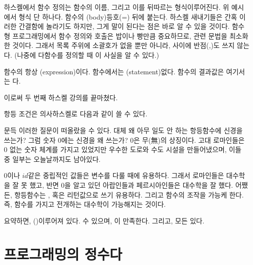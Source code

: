 하스켈에서 함수 정의는 함수의 이름, 그리고 이를 뒤따르는 형식\trParameter\로 이루어진다.
위 예시에서 형식\trParameter\는  단 하나다.
함수의 \trFunctionBody(body)\는 등호(=) 뒤에 붙는다.
하스켈 새내기들은 간혹 이러한 간결함에 놀라기도 하지만, 그게 말이 된다는 점은 바로 알 수 있을 것이다.
함수형 프로그래밍에서 함수 정의와 호출은 밥이나 빵만큼 중요하므로, 관련 문법을 최소화한 것이다.
그래서 \trArgument 목록 주위에 소괄호가 없을 뿐만 아니라, \trArgument 사이에 반점(,)도 쓰지 않는다.
(나중에 다\trArgument 함수를 정의할 때 이 사실을 알 수 있다.)

함수의 \trFunctionBody\는 항상 \trExpression(expression)이다. 함수에서는 \trStatement(statement)\는 없다. 
함수의 결과값은  여기서는 다.

이로써 두 번째 하스켈 강의를 끝마쳤다.

항등 조건은 의사하스켈로 다음과 같이 쓸 수 있다.

문득 이러한 질문이 떠올랐을 수 있다. 대체 왜 아무 일도 안 하는 항등함수에 신경을 쓰는가?
그럼 숫자 0에는 신경을 왜 쓰는가? 0은 무(無)의 상징이다. 고대 로마인들은 0 없는 숫자 체계를 가지고 있었지만
우수한 도로와 수도 시설을 만들어냈으며, 이들 중 일부는 오늘날까지도 남아있다.

0이나 $id$같은 중립적인 값들은 \trSymbolic 변수를 다룰 때에 유용하다.
그래서 로마인들은 대수학을 잘 못 했고, 반면 0을 알고 있던 아랍인들과 페르시아인들은 대수학을 잘 했다.
어쨌든, 항등함수는  \trArgument, 혹은 리턴값으로 쓰기 유용하다. 
그리고 \trHigherOrderFunction\가 함수의  조작을 가능케 한다.
즉, 함수를 가지고 전개하는 대수학이 가능해지는 것이다.

요약하면, \trCategory\는 \trObject\와 \trArrow(\trMorphism)\로 이루어져 있다.
\trArrow\는  수 있으며, 이 \trComposition\은 \trAssociativity\을 만족한다.
그리고, 모든    \trIdentity \trArrow\가 있다.

\section{\trComposition\은 프로그래밍의 정수다}

